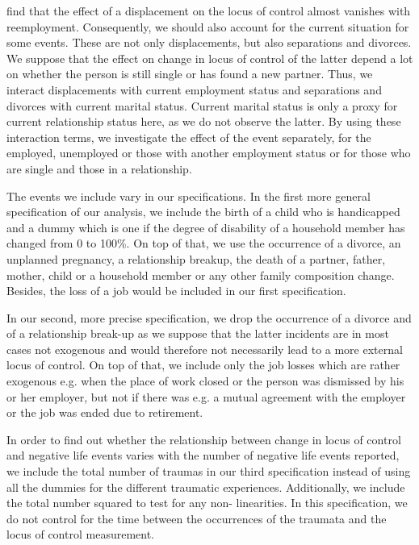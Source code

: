 \documentclass[12pt, a4paper, fleqn, parskip]{scrartcl}
\begin{document}
\citet{preuss2017} find that the effect of a displacement on the locus of
control almost vanishes with reemployment. Consequently, we should also account
for the current situation for some events. These are not only displacements,
but also separations and divorces. We suppose that the effect on change in
locus of control of the latter depend a lot on whether the person is still
single or has found a new partner. Thus, we interact displacements with current
employment status and separations and divorces with current marital status.
Current marital status is only a proxy for current relationship status here, as
we do not observe the latter. By using these interaction terms, we investigate
the effect of the event separately, for the employed, unemployed or those with
another employment status or for those who are single and those in a
relationship.

The events we include vary in our specifications. In the first more general
specification of our analysis, we include the birth of a child who is
handicapped and a dummy which is one if the degree of disability of a household
member has changed from 0 to 100\%. On top of that, we use the occurrence of a
divorce, an unplanned pregnancy, a relationship breakup, the death of a
partner, father, mother, child or a household member or any other family
composition change. Besides, the loss of a job would be included in our first
specification.

In our second, more precise specification, we drop the occurrence of a divorce
and of a relationship break-up as we suppose that the latter incidents are in
most cases not exogenous and would therefore not necessarily lead to a more
external locus of control. On top of that, we include only the job losses which
are rather exogenous e.g. when the place of work closed or the person was
dismissed by his or her employer, but not if there was e.g. a mutual agreement
with the employer or the job was ended due to retirement.

In order to find out whether the relationship between change in locus of
control and negative life events varies with the number of negative life events
reported, we include the total number of traumas in our third specification
instead of using all the dummies for the different traumatic experiences.
Additionally, we include the total number squared to test for any non-
linearities. In this specification, we do not control for the time between the
occurrences of the traumata and the locus of control measurement.
\end{document}
